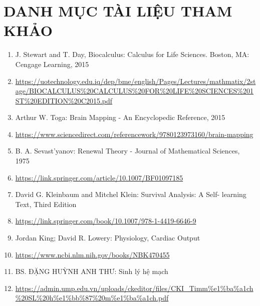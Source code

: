 \documentclass[12pt,a4paper]{article}
\begin{document}
\section*{\small\textbf{DANH MỤC TÀI LIỆU THAM KHẢO}}
\begin{small}
	\begin{enumerate}
		\item J. Stewart and T. Day, Biocalculus: Calculus for Life Sciences. Boston, MA: Cengage Learning, 2015
		\item[] \textcolor{cyan}{\url{https://uotechnology.edu.iq/dep/bme/english/Pages/Lectures/mathmatix/2stage/BIOCALCULUS\%20CALCULUS\%20FOR\%20LIFE\%20SCIENCES\%201ST\%20EDITION\%20C2015.pdf}}
		\item Arthur W. Toga: Brain Mapping - An Encyclopedic Reference, 2015
		\item[] \textcolor{cyan}{\url{https://www.sciencedirect.com/referencework/9780123973160/brain-mapping}}
		\item B. A. Sevast'yanov: Renewal Theory - Journal of Mathematical Sciences, 1975
		\item[] \textcolor{cyan}{\url{https://link.springer.com/article/10.1007/BF01097185}}
		\item David G. Kleinbaum and Mitchel Klein: Survival Analysis: A Self- learning Text, Third Edition
		\item[] \textcolor{cyan}{\url{https://link.springer.com/book/10.1007/978-1-4419-6646-9}}
		\item Jordan King; David R. Lowery: Physiology, Cardiac Output
		\item[] \textcolor{cyan}{\url{https://www.ncbi.nlm.nih.gov/books/NBK470455}}
		\item BS. ĐẶNG HUỲNH ANH THƯ: Sinh lý hệ mạch
		\item[] \textcolor{cyan}{\url{https://admin.ump.edu.vn/uploads/ckeditor/files/CKI\_Timm\%e1\%ba\%a1ch\%20SL\%20h\%e1\%bb\%87\%20m\%e1\%ba\%a1ch.pdf}}

	\end{enumerate}
\end{small}
\end{document}
